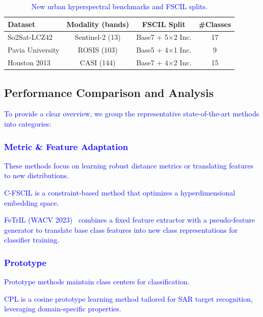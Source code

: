 ﻿\documentclass[letterpaper,journal]{IEEEtran}
\begin{document}
\begin{table}[!t]
\centering
\caption{\textcolor{blue}{New urban hyperspectral benchmarks and FSCIL splits.}}
\label{tab:urban_datasets}
\begin{tabular}{@{}lccc@{}}
\toprule
Dataset & Modality (bands) & FSCIL Split & \#Classes \\
\midrule
So2Sat-LCZ42 & Sentinel-2 (13) & Base7 + 5$\times$2 Inc. & 17 \\
Pavia University & ROSIS (103) & Base5 + 4$\times$1 Inc. & 9 \\
Houston 2013 & CASI (144) & Base7 + 4$\times$2 Inc. & 15 \\
\bottomrule
\end{tabular}
\end{table}

\subsection{Performance Comparison and Analysis}

\textcolor{blue}{To provide a clear overview, we group the representative state-of-the-art methods into categories:}

\subsubsection{\textcolor{blue}{Metric \& Feature Adaptation}}

\textcolor{blue}{These methods focus on learning robust distance metrics or translating features to new distributions.}

\textcolor{blue}{C-FSCIL \cite{hersche2022cfscil} is a constraint-based method that optimizes a hyperdimensional embedding space.}

\textcolor{blue}{FeTrIL (WACV 2023)~\cite{petit2023fetril} combines a fixed feature extractor with a pseudo-feature generator to translate base class features into new class representations for classifier training.}

\subsubsection{\textcolor{blue}{Prototype}}
\textcolor{blue}{Prototype methods maintain class centers for classification.}

\textcolor{blue}{CPL \cite{zhao2023} is a cosine prototype learning method tailored for SAR target recognition, leveraging domain-specific properties.}
\end{document}
